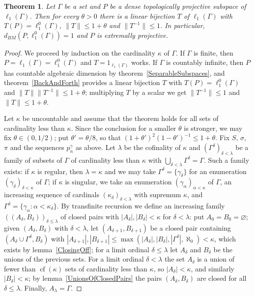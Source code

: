 \documentclass[12pt]{article}
\newtheorem{theorem}{Theorem}[section]
\newcommand{\lo}[1]{\ell_1^0(#1)}
\newcommand{\ellone}[1]{\ell_1(#1)}
\newcommand{\norm}[1]{\lVert #1\rVert}
\newcommand{\BM}{d_{BM}}
\begin{document}
\begin{theorem}\label{GeneralTheorem} Let $\Gamma$ be a set and $P$ be a
    dense topologically projective subspace of $\ellone{\Gamma}$. Then for
    every $\theta>0$ there is a linear bijection $T$ of $\ellone{\Gamma}$ with
    $T(P)=\lo{\Gamma}$, $\norm{T}\leq 1+\theta$ and $\norm{T^{-1}}\leq 1$. In
    particular, $\BM(P,\lo{\Gamma})=1$ and $P$ is extremally projective.
\end{theorem}
\begin{proof} We proceed by induction on the cardinality $\kappa$ of
    $\Gamma$. If $\Gamma$ is finite, then $P=\ellone{\Gamma}=\lo{\Gamma}$ and
    $T=1_{\ellone{\Gamma}}$ works. If $\Gamma$ is countably infinite, then
    $P$ has countable algebraic dimension by theorem~\ref{SeparableSubspaces},
    and theorem~\ref{BackAndForth} provides a linear bijection $T$ with
    $T(P)=\lo{\Gamma}$ and $\norm{T}\norm{T^{-1}}\leq 1+\theta$; multiplying
    $T$ by a scalar we get $\norm{T^{-1}}\leq 1$ and $\norm{T}\leq 1+\theta$.

    Let $\kappa$ be uncountable and assume that the theorem holds for all
    sets of cardinality less than $\kappa$. Since the conclusion for a smaller
    $\theta$ is stronger, we may fix $\theta\in(0,1/2)$; put
    $\theta'=\theta/8$, so that ${(1+\theta')}^2{(1-\theta')}^{-1}\leq 1+\theta$.
    Fix $S$, $\sigma$, $\pi$ and the sequences $p^\gamma_n$ as above. Let
    $\lambda$ be the cofinality of $\kappa$ and ${(\Gamma^\delta)}_{\delta<\lambda}$
    be a family of subsets of $\Gamma$ of cardinality less than $\kappa$ with
    $\bigcup_{\delta<\lambda}\Gamma^\delta=\Gamma$. Such a family exists: if
    $\kappa$ is regular, then $\lambda=\kappa$ and we may take
    $\Gamma^\delta=\{\gamma_\delta\}$ for an enumeration
    ${(\gamma_\delta)}_{\delta<\kappa}$ of $\Gamma$; if $\kappa$ is singular,
    we take an enumeration ${(\gamma_\alpha)}_{\alpha<\kappa}$ of $\Gamma$, an
    increasing sequence of cardinals ${(\kappa_\delta)}_{\delta<\lambda}$ with
    supremum $\kappa$, and $\Gamma^\delta=\{\gamma_\alpha:\alpha<\kappa_\delta\}$.
    By transfinite recursion
    we define an increasing family ${((A_\delta,B_\delta))}_{\delta\leq\lambda}$
    of closed pairs with $|A_\delta|,|B_\delta|<\kappa$ for $\delta<\lambda$:
    put $A_0=B_0=\varnothing$; given $(A_\delta,B_\delta)$ with $\delta<\lambda$,
    let $(A_{\delta+1},B_{\delta+1})$ be a closed pair containing
    $(A_\delta\cup\Gamma^\delta,B_\delta)$ with
    $|A_{\delta+1}|,|B_{\delta+1}|\leq\max(|A_\delta|,|B_\delta|,|\Gamma^\delta|,\aleph_0)<\kappa$,
    which exists by lemma~\ref{ClosingOff}; for a limit ordinal
    $\delta\leq\lambda$ let $A_\delta$ and $B_\delta$ be the unions of the
    previous sets. For a limit ordinal $\delta<\lambda$ the set $A_\delta$ is
    a union of fewer than $\operatorname{cf}(\kappa)$ sets of cardinality
    less than $\kappa$, so $|A_\delta|<\kappa$, and similarly $|B_\delta|<\kappa$;
    by lemma~\ref{UnionsOfClosedPairs} the pairs $(A_\delta,B_\delta)$ are
    closed for all $\delta\leq\lambda$. Finally, $A_\lambda=\Gamma$.


\end{proof}
\end{document}
